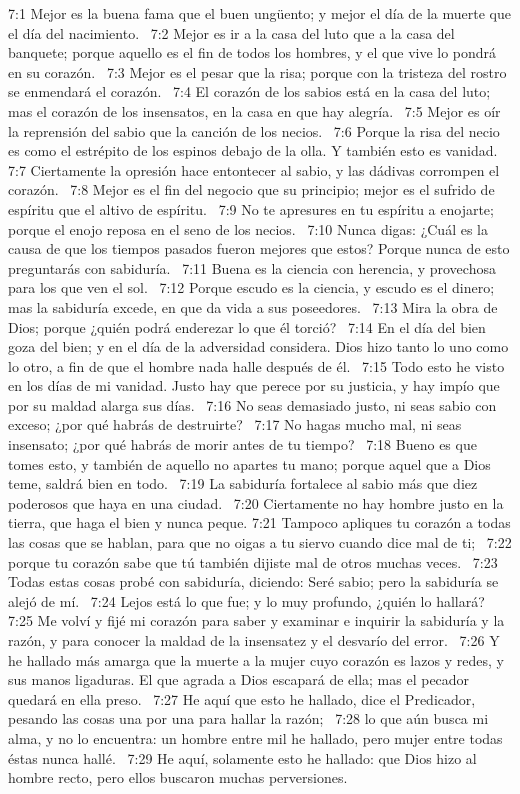7:1 Mejor es la buena fama que el buen ungüento; y mejor el día de la muerte que el día del nacimiento.  
7:2 Mejor es ir a la casa del luto que a la casa del banquete; porque aquello es el fin de todos los hombres, y el que vive lo pondrá en su corazón.  
7:3 Mejor es el pesar que la risa; porque con la tristeza del rostro se enmendará el corazón.  
7:4 El corazón de los sabios está en la casa del luto; mas el corazón de los insensatos, en la casa en que hay alegría.  
7:5 Mejor es oír la reprensión del sabio que la canción de los necios.  
7:6 Porque la risa del necio es como el estrépito de los espinos debajo de la olla. Y también esto es vanidad.  
7:7 Ciertamente la opresión hace entontecer al sabio, y las dádivas corrompen el corazón.  
7:8 Mejor es el fin del negocio que su principio; mejor es el sufrido de espíritu que el altivo de espíritu.  
7:9 No te apresures en tu espíritu a enojarte; porque el enojo reposa en el seno de los necios.  
7:10 Nunca digas: ¿Cuál es la causa de que los tiempos pasados fueron mejores que estos? Porque nunca de esto preguntarás con sabiduría.  
7:11 Buena es la ciencia con herencia, y provechosa para los que ven el sol.  
7:12 Porque escudo es la ciencia, y escudo es el dinero; mas la sabiduría excede, en que da vida a sus poseedores.  
7:13 Mira la obra de Dios; porque ¿quién podrá enderezar lo que él torció?  
7:14 En el día del bien goza del bien; y en el día de la adversidad considera. Dios hizo tanto lo uno como lo otro, a fin de que el hombre nada halle después de él.  
7:15 Todo esto he visto en los días de mi vanidad. Justo hay que perece por su justicia, y hay impío que por su maldad alarga sus días.  
7:16 No seas demasiado justo, ni seas sabio con exceso; ¿por qué habrás de destruirte?  
7:17 No hagas mucho mal, ni seas insensato; ¿por qué habrás de morir antes de tu tiempo?  
7:18 Bueno es que tomes esto, y también de aquello no apartes tu mano; porque aquel que a Dios teme, saldrá bien en todo.  
7:19 La sabiduría fortalece al sabio más que diez poderosos que haya en una ciudad.  
7:20 Ciertamente no hay hombre justo en la tierra, que haga el bien y nunca peque. 
7:21 Tampoco apliques tu corazón a todas las cosas que se hablan, para que no oigas a tu siervo cuando dice mal de ti;  
7:22 porque tu corazón sabe que tú también dijiste mal de otros muchas veces.  
7:23 Todas estas cosas probé con sabiduría, diciendo: Seré sabio; pero la sabiduría se alejó de mí.  
7:24 Lejos está lo que fue; y lo muy profundo, ¿quién lo hallará?  
7:25 Me volví y fijé mi corazón para saber y examinar e inquirir la sabiduría y la razón, y para conocer la maldad de la insensatez y el desvarío del error.  
7:26 Y he hallado más amarga que la muerte a la mujer cuyo corazón es lazos y redes, y sus manos ligaduras. El que agrada a Dios escapará de ella; mas el pecador quedará en ella preso.  
7:27 He aquí que esto he hallado, dice el Predicador, pesando las cosas una por una para hallar la razón;  
7:28 lo que aún busca mi alma, y no lo encuentra: un hombre entre mil he hallado, pero mujer entre todas éstas nunca hallé.  
7:29 He aquí, solamente esto he hallado: que Dios hizo al hombre recto, pero ellos buscaron muchas perversiones.  
